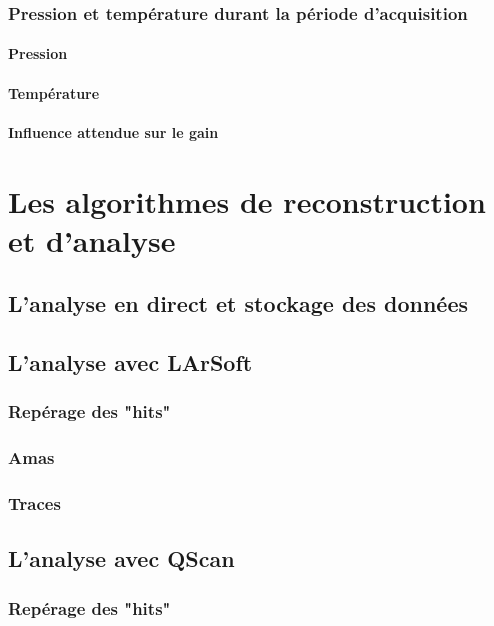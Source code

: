             \subsubsection{Pression et température durant la période d'acquisition}
                \paragraph{Pression}
                \paragraph{Température}
                \paragraph{Influence attendue sur le gain}
        
    \section{Les algorithmes de reconstruction et d'analyse}
        \subsection{L'analyse en direct et stockage des données}
        \subsection{L'analyse avec LArSoft}\label{sec::larsoft}
            \subsubsection{Repérage des "hits"}
            \subsubsection{Amas}
            \subsubsection{Traces}
        \subsection{L'analyse avec QScan}\label{sec::qscan}
            \subsubsection{Repérage des "hits"}
